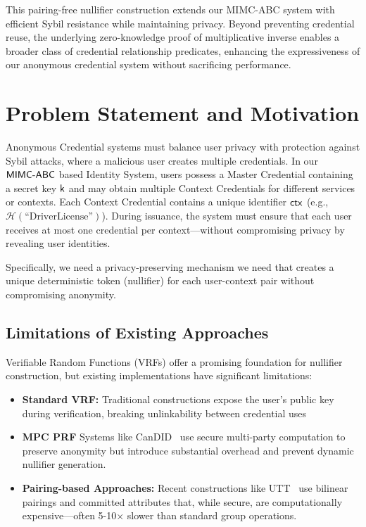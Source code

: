 
\noindent This pairing-free nullifier construction extends our MIMC-ABC system with efficient Sybil resistance while maintaining privacy. Beyond preventing credential reuse, the underlying zero-knowledge proof of multiplicative inverse enables a broader class of credential relationship predicates, enhancing the expressiveness of our anonymous credential system without sacrificing performance.

\section{Problem Statement and Motivation}
Anonymous Credential systems must balance user privacy with protection against Sybil attacks, where a malicious user creates multiple credentials. In our $\mathsf{MIMC\text{-}ABC}$ based Identity System, users possess a Master Credential containing a secret key $\mathsf{k}$ and may obtain multiple Context Credentials for different services or contexts. Each Context Credential contains a unique identifier $\mathsf{ctx}$ (e.g., $\mathcal{H}(\text{``DriverLicense''})$). During issuance, the system must ensure that each user receives at most one credential per context—without compromising privacy by revealing user identities.

Specifically, we need a privacy-preserving mechanism we need that creates a unique deterministic token (nullifier) for each user-context pair without compromising anonymity.

\subsection{Limitations of Existing Approaches}

Verifiable Random Functions (VRFs) offer a promising foundation for nullifier construction, but existing implementations have significant limitations:

\begin{itemize}
    \item \textbf{Standard VRF:} Traditional constructions expose the user's public key during verification, breaking unlinkability between credential uses~\cite{hutchison_verifiable_2005}

    \item \textbf{MPC PRF} Systems like CanDID~\cite{maram2021candid} use secure multi-party computation to preserve anonymity but introduce substantial overhead and prevent dynamic nullifier generation.

    \item \textbf{Pairing-based Approaches:} Recent constructions like UTT~\cite{tomescu2022utt} use bilinear pairings and committed attributes that, while secure, are computationally expensive—often 5-10× slower than standard group operations.
\end{itemize}


